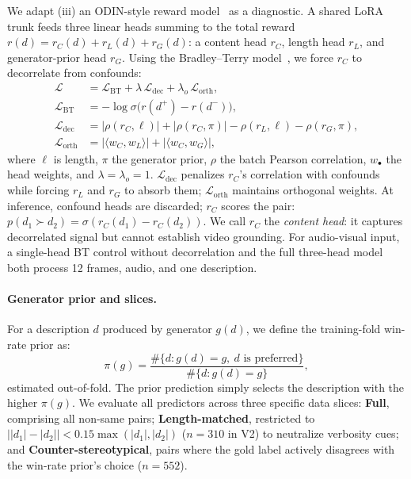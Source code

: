 \documentclass[sigconf,screen]{acmart}
\begin{document}
We adapt (iii) an ODIN-style reward model~\cite{chen2024odin} as a diagnostic. A shared LoRA trunk feeds three linear heads summing to the total reward $r(d) = r_C(d) + r_L(d) + r_G(d)$: a content head $r_C$, length head $r_L$, and generator-prior head $r_G$. Using the Bradley--Terry model~\cite{bradley1952rank}, we force $r_C$ to decorrelate from confounds:
\begin{equation}
\begin{aligned}
\mathcal{L} &= \mathcal{L}_{\mathrm{BT}} + \lambda\,\mathcal{L}_{\mathrm{dec}} + \lambda_o\,\mathcal{L}_{\mathrm{orth}},\\
\mathcal{L}_{\mathrm{BT}} &= -\log\sigma\!\big(r(d^{+})-r(d^{-})\big),\\
\mathcal{L}_{\mathrm{dec}} &= |\rho(r_C,\ell)| + |\rho(r_C,\pi)| - \rho(r_L,\ell) - \rho(r_G,\pi),\\
\mathcal{L}_{\mathrm{orth}} &= |\langle w_C,w_L\rangle| + |\langle w_C,w_G\rangle|,
\end{aligned}
\end{equation}
where $\ell$ is length, $\pi$ the generator prior, $\rho$ the batch Pearson correlation, $w_\bullet$ the head weights, and $\lambda = \lambda_o = 1$. $\mathcal{L}_{\mathrm{dec}}$ penalizes $r_C$'s correlation with confounds while forcing $r_L$ and $r_G$ to absorb them; $\mathcal{L}_{\mathrm{orth}}$ maintains orthogonal weights. At inference, confound heads are discarded; $r_C$ scores the pair: $p(d_1\!\succ\!d_2) = \sigma(r_C(d_1) - r_C(d_2))$. We call $r_C$ the \emph{content head}: it captures decorrelated signal but cannot establish video grounding. For audio-visual input, a single-head BT control without decorrelation and the full three-head model both process 12 frames, audio, and one description.

\paragraph{Generator prior and slices.}
For a description $d$ produced by generator $g(d)$, we define the training-fold win-rate prior as:
\begin{equation}
\pi(g) = \frac{\#\{d : g(d)=g,\ d \text{ is preferred}\}}{\#\{d : g(d)=g\}},
\end{equation}
estimated out-of-fold. The prior prediction simply selects the description with the higher $\pi(g)$. We evaluate all predictors across three specific data slices: \textbf{Full}, comprising all non-same pairs; \textbf{Length-matched}, restricted to $\lvert |d_1|-|d_2|\rvert<0.15\max(|d_1|,|d_2|)$ ($n = 310$ in V2) to neutralize verbosity cues; and \textbf{Counter-stereotypical}, pairs where the gold label actively disagrees with the win-rate prior's choice ($n = 552$).
\end{document}
